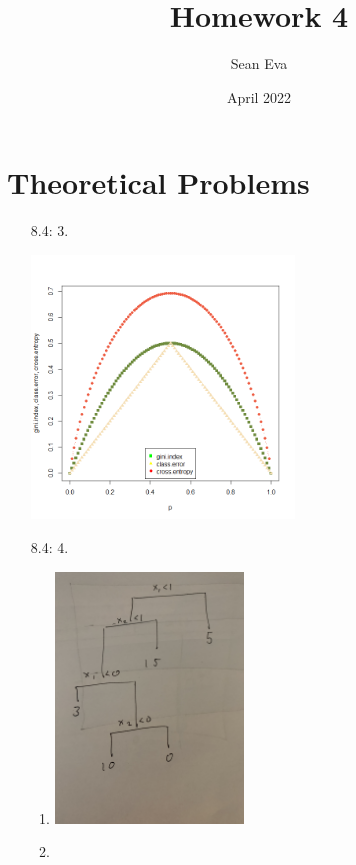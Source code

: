 \documentclass{article}
\title{Homework 4}
\author{Sean Eva}
\date{April 2022}
\begin{document}
\maketitle

\section{Theoretical Problems}
\begin{enumerate}
    \item [8.4: 3. ]
    
    \begin{center}
        \includegraphics[width=7cm]{HW4_3.png}
    \end{center}
    
    \item [8.4: 4. ]
    
    \begin{enumerate}
        \item 
        
        \begin{center}
            \includegraphics[width=5cm]{HW4_4a.jpg}
        \end{center}
        
        \item
        

\end{enumerate}
\end{enumerate}
\end{document}
